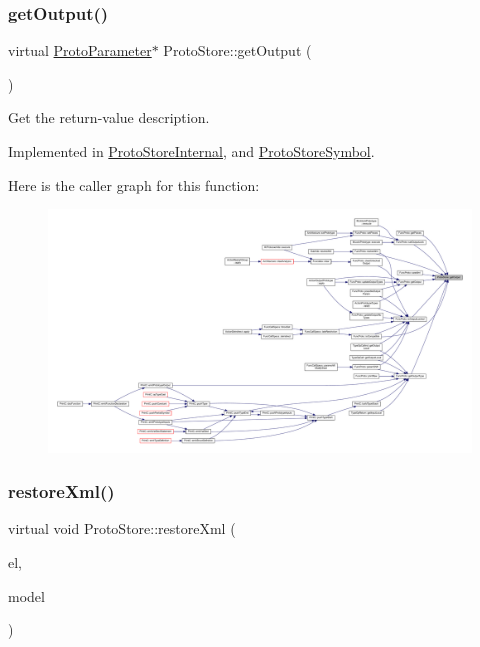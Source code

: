 \subsubsection{\texorpdfstring{getOutput()}{getOutput()}}
{\footnotesize\ttfamily virtual \mbox{\hyperlink{class_proto_parameter}{Proto\+Parameter}}$\ast$ Proto\+Store\+::get\+Output (\begin{DoxyParamCaption}\item[{void}]{ }\end{DoxyParamCaption})\hspace{0.3cm}{\ttfamily [pure virtual]}}



Get the return-\/value description. 



Implemented in \mbox{\hyperlink{class_proto_store_internal_a01b4100ec95fcd835b7f8ae6cad8f796}{Proto\+Store\+Internal}}, and \mbox{\hyperlink{class_proto_store_symbol_a19fe1743657cce5d27aec73bf9056566}{Proto\+Store\+Symbol}}.

Here is the caller graph for this function\+:
\nopagebreak
\begin{figure}[H]
\begin{center}
\leavevmode
\includegraphics[width=350pt]{class_proto_store_aeb240f8e1b797060196c4bb7be000197_icgraph}
\end{center}
\end{figure}
\mbox{\label{class_proto_store_a7311214c33205be191361836d716f99b}} 
\subsubsection{\texorpdfstring{restoreXml()}{restoreXml()}}
{\footnotesize\ttfamily virtual void Proto\+Store\+::restore\+Xml (\begin{DoxyParamCaption}\item[{const \mbox{\hyperlink{class_element}{Element}} $\ast$}]{el,  }\item[{\mbox{\hyperlink{class_proto_model}{Proto\+Model}} $\ast$}]{model }\end{DoxyParamCaption})\hspace{0.3cm}{\ttfamily [pure virtual]}}



